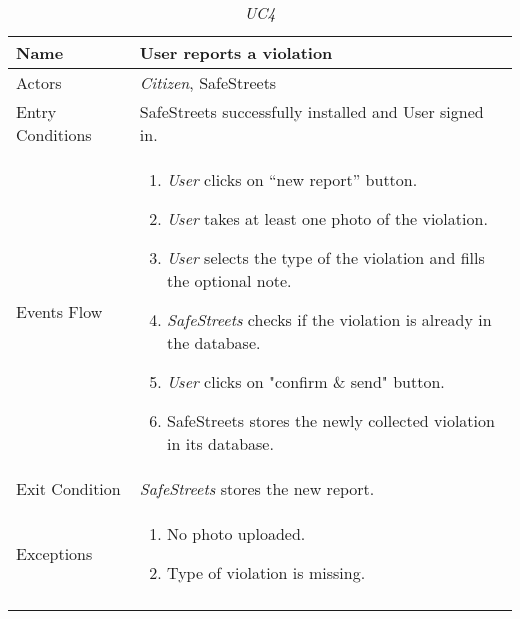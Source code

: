 \documentclass[../../../RASD.tex]{subfiles}
\begin{document}
    \begin{center}
        \begin{longtable}{| p{.35\linewidth} | p{.65\linewidth} |}
            \hline
            \textbf{Name} & \textbf{User reports a violation}\\ \hline
            Actors & \textit{Citizen}, SafeStreets\\ \hline
            Entry Conditions & SafeStreets successfully installed and User signed in.\\ \hline
            Events Flow &
            \begin{enumerate}
                \item \textit{User} clicks on “new report” button.
                \item \textit{User} takes at least one photo of the violation.
                \item \textit{User} selects the type of the violation and fills the optional note.
                \item \textit{SafeStreets} checks if the violation is already in the database.
                \item \textit{User} clicks on "confirm \& send" button.
                \item SafeStreets stores the newly collected violation in its database.
            \end{enumerate}
            \\ \hline
            Exit Condition & \textit{SafeStreets} stores the new report.\\ \hline
            Exceptions &
            \begin{enumerate}
                \item No photo uploaded.
                \item Type of violation is missing.
            \end{enumerate}
             \\
            \hline
            \caption[\textit{Use Case 4}]{\textit{UC4}}
        \end{longtable}
    \end{center}
    \newpage
\end{document}
